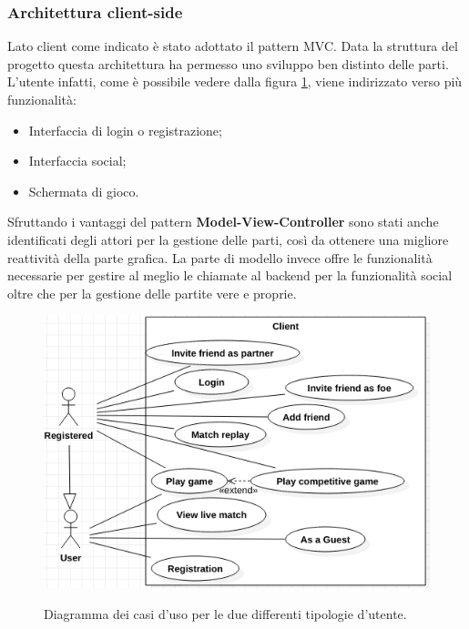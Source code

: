             \subsubsection{Architettura client-side}\label{subsub:architecture:client}
            Lato client come indicato è stato adottato il pattern MVC. Data la struttura del progetto questa architettura ha permesso uno sviluppo ben distinto delle parti.
            \\
            L'utente infatti, come è possibile vedere dalla figura \ref{fig:UserUseCaseDiagram}, viene indirizzato verso più funzionalità:
            \begin{itemize}
             \item Interfaccia di login o registrazione;
             \item Interfaccia social;
             \item Schermata di gioco.
            \end{itemize}
            Sfruttando i vantaggi del pattern \textbf{Model-View-Controller} sono stati anche identificati degli attori per la gestione delle parti, così da ottenere una migliore reattività della parte grafica. 
            La parte di modello invece offre le funzionalità necessarie per gestire al meglio le chiamate al backend per la funzionalità social oltre che per la gestione delle partite vere e proprie.
            
            
	     \begin{figure}[!h]
                \includegraphics[scale=0.7]{images/UserUseCaseDiagram.png}
                \label{fig:UserUseCaseDiagram}
                \caption{Diagramma dei casi d'uso per le due differenti tipologie d'utente.}
            \end{figure}
            
